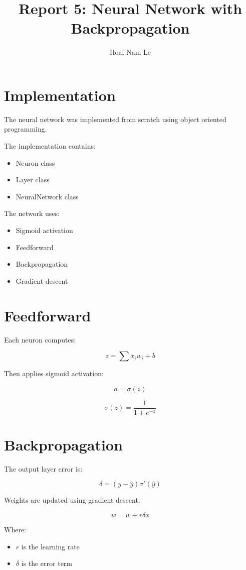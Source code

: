 \documentclass{article}
\title{Report 5: Neural Network with Backpropagation}
\author{Hoai Nam Le}
\begin{document}
\maketitle

\section{Implementation}

The neural network was implemented from scratch
using object oriented programming.

The implementation contains:

\begin{itemize}
    \item Neuron class
    \item Layer class
    \item NeuralNetwork class
\end{itemize}

The network uses:
\begin{itemize}
    \item Sigmoid activation
    \item Feedforward
    \item Backpropagation
    \item Gradient descent
\end{itemize}

\section{Feedforward}

Each neuron computes:

\[
z = \sum x_iw_i + b
\]

Then applies sigmoid activation:

\[
a = \sigma(z)
\]

\[
\sigma(z)=\frac{1}{1+e^{-z}}
\]

\section{Backpropagation}

The output layer error is:

\[
\delta = (y-\hat{y})\sigma'(\hat{y})
\]

Weights are updated using gradient descent:

\[
w = w + r\delta x
\]

Where:
\begin{itemize}
    \item $r$ is the learning rate
    \item $\delta$ is the error term
\end{itemize}
\end{document}
